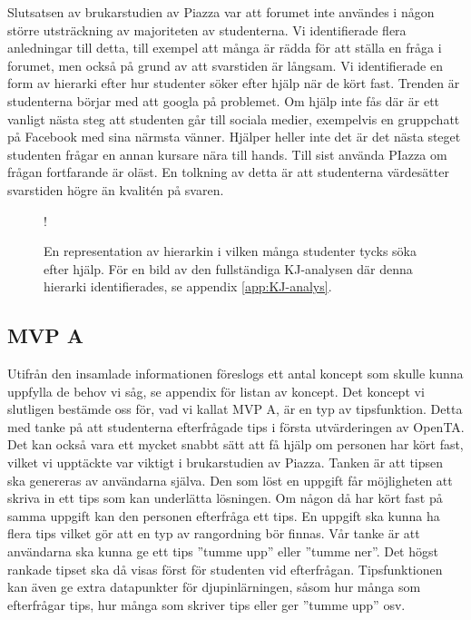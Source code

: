 Slutsatsen av brukarstudien av Piazza var att forumet inte användes i någon större utsträckning av majoriteten av studenterna. Vi identifierade flera anledningar till detta, till exempel att många är rädda för att ställa en fråga i forumet, men också på grund av att svarstiden är långsam. Vi identifierade en form av hierarki efter hur studenter söker efter hjälp när de kört fast. Trenden är studenterna börjar med att googla på problemet. Om hjälp inte fås där är ett vanligt nästa steg att studenten går till sociala medier, exempelvis en gruppchatt på Facebook med sina närmsta vänner. Hjälper heller inte det är det nästa steget studenten frågar en annan kursare nära till hands. Till sist använda PIazza om frågan fortfarande är oläst. En tolkning av detta är att studenterna värdesätter svarstiden högre än kvalitén på svaren.

\begin{center}
\begin{figure}[hbtp]
    \centering
    \hspace{-20px}
     {!} {
        
    }
    \caption{En representation av hierarkin i vilken många studenter tycks söka efter hjälp. För en bild av den fullständiga KJ-analysen där denna hierarki identifierades, se appendix \ref{app:KJ-analys}. }
    \label{fig:raket5}
\end{figure}
\end{center}

\subsection{MVP A}

Utifrån den insamlade informationen föreslogs ett antal koncept som skulle kunna uppfylla de behov vi såg, se appendix för listan av koncept. Det koncept vi slutligen bestämde oss för, vad vi kallat MVP A, är en typ av tipsfunktion. Detta med tanke på att studenterna efterfrågade tips i första utvärderingen av OpenTA. Det kan också vara ett mycket snabbt sätt att få hjälp om personen har kört fast, vilket vi upptäckte var viktigt i brukarstudien av Piazza. Tanken är att tipsen ska genereras av användarna själva. Den som löst en uppgift får möjligheten att skriva in ett tips som kan underlätta lösningen. Om någon då har kört fast på samma uppgift kan den personen efterfråga ett tips. En uppgift ska kunna ha flera tips vilket gör att en typ av rangordning bör finnas. Vår tanke är att användarna ska kunna ge ett tips ''tumme upp'' eller ''tumme ner''. Det högst rankade tipset ska då visas först för studenten vid efterfrågan. Tipsfunktionen kan även ge extra datapunkter för djupinlärningen, såsom hur många som efterfrågar tips, hur många som skriver tips eller ger ''tumme upp'' osv. 

